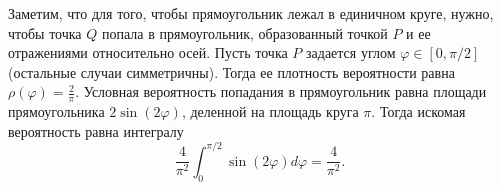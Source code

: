 \documentclass{article}
\begin{document}
Заметим, что для того, чтобы прямоугольник лежал в единичном круге, нужно, чтобы точка $Q$ попала в прямоугольник, образованный точкой $P$ и ее отражениями относительно осей. 
Пусть точка $P$ задается углом $\varphi \in [0, \pi/2]$ (остальные случаи симметричны). Тогда ее плотность вероятности равна $\rho(\varphi) = \frac{2}{\pi}$.
Условная вероятность попадания в прямоугольник равна площади прямоугольника $2\sin(2\varphi)$, деленной на площадь круга $\pi$. Тогда искомая вероятность равна интегралу
$$\frac{4}{\pi^2} \int_0^{\pi/2} \sin(2\varphi) d\varphi = \frac{4}{\pi^2}.$$ 
\end{document}
